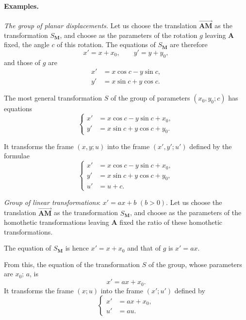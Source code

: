 \documentclass[leqno,11pt]{book}
\numberwithin{equation}{chapter}
\theoremstyle{shape1}
\theoremstyle{shapesmall}
\newcommand{\somespace}{\vspace{9pt}}
\begin{document}
\paragraph{Examples.}
\label{sec:102}
{\small{}
\emph{The group of planar displacements.} Let us choose the translation $\overrightarrow{\mathbf{AM}}$ as the transformation $S_{\mathbf{M}}$, and choose as the parameters of the rotation $g$ leaving $\mathbf{A}$ fixed, the angle $c$ of this rotation. The equations of $S_{\mathbf{M}}$ are therefore
\[
x'=x+x_{0},\qquad y'=y+y_{0},
\]
and those of $g$ are
\begin{align*}
  x'&=x\cos c-y\sin c,\\
  y'&=x\sin c+y\cos c.
\end{align*}

The most general transformation $S$ of the group of parameters $(x_{0},y_{0};c)$ has equations
\begin{equation}
  \label{eq:7.3}
  \left\{
    \begin{aligned}
      x'&=x\cos c-y\sin c+x_{0},\\
      y'&=x\sin c+y\cos c+y_{0}.
    \end{aligned}
  \right.
\end{equation}

It transforms the frame $(x,y;u)$ into the frame $(x',y';u')$ defined by the formulae
\begin{equation}
  \label{eq:7.4}
  \left\{
    \begin{aligned}
      x'&=x\cos c-y\sin c+x_{0},\\
      y'&=x\sin c+y\cos c+y_{0},\\
      u'&=u+c.
    \end{aligned}
  \right.
\end{equation}

\somespace

\emph{Group of linear transformations}: $x'=ax+b$ $(b>0)$. Let us choose the translation $\overrightarrow{\mathbf{AM}}$ as the transformation $S_{\mathbf{M}}$, and choose as the parameters of the homothetic transformations leaving $\mathbf{A}$ fixed the ratio of these homothetic transformations.

The equation of $S_{\mathbf{M}}$ is hence $x'=x+x_{0}$ and that of $g$ is $x'=ax$.

From this, the equation of the transformation $S$ of the group, whose parameters are $x_{0}$; $a$, is
\begin{equation}
  \label{eq:7.5}
  x'=ax+x_{0}.
\end{equation}
It transforms the frame $(x;u)$ into the frame $(x';u')$ defined by
\begin{equation}
  \label{eq:7.6}
  \left\{
    \begin{aligned}
      x'&=ax+x_{0},\\
      u'&=au.
    \end{aligned}
  \right.
\end{equation}

}
\end{document}
